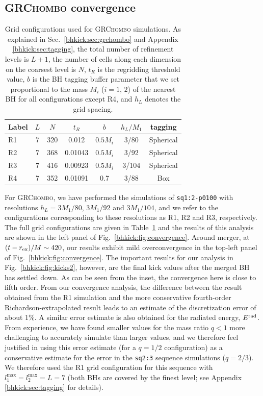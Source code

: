 \subsection{\textsc{GRChombo} convergence}
\begin{table}[b]
{   
    \caption{Grid configurations used for \textsc{GRChombo} simulations.
    As explained in Sec.~\ref{bhkick:sec:grchombo} and Appendix \ref{bhkick:sec:tagging},
    the total 
    number of refinement levels is $L+1$, the number of cells along each
    dimension on the coarsest level is $N$, $t_R$ is the regridding 
    threshold value, $b$ is the BH tagging buffer parameter
    that we
    set proportional to the mass $M_i$ ($i=1,\,2$)
    of the nearest BH for all configurations except R4, 
    and $h_L$ denotes the grid spacing.
    }
    \centering
    \begin{tabular}{lcccccc}\hline
        Label & $L$ & $N$ & $t_R$ & $b$ & $h_L/M_1$ & tagging\\
        \hline
        R1 & 7 & 320 & 0.012 & $0.5M_i$ & 3/80 & Spherical \\
        R2 & 7 & 368 & 0.01043 & $0.5M_i$ & 3/92 & Spherical\\
        R3 & 7 & 416 & 0.00923 & $0.5M_i$ & 3/104 & Spherical\\
        R4 & 7 & 352 & 0.01091 & 0.7 & 3/88 & Box\\\hline
    \end{tabular}
}
    \label{bhkick:tab:grchombo-grids}
\end{table}
For \textsc{GRChombo}, we have performed the simulations of 
\texttt{sq1:2-p0100} with resolutions $h_L=3M_1/80$, $3M_1/92$ and 
$3M_1/104$, and we refer to the configurations corresponding to these 
resolutions as R1, R2 and R3, respectively.
The full grid configurations 
are given in Table~\ref{bhkick:tab:grchombo-grids} and the results of this 
analysis are shown in the left panel of Fig.~\ref{bhkick:fig:convergence}. Around
merger, at $(t-r_{\rm ex})/M\sim 420$, our results exhibit mild
overconvergence
in the top-left panel of Fig.~\ref{bhkick:fig:convergence}.
The important results for our analysis in Fig.~\ref{bhkick:fig:kicks2},
however, are the final kick values after the merged BH has settled down.
As can be seen from the inset, the convergence here is close to 
fifth order. 
From our convergence 
analysis, the difference between the result obtained from the R1 simulation 
and the more conservative fourth-order Richardson-extrapolated result leads 
to an estimate of the discretization error of about $1\%$. A similar error 
estimate is also obtained for the radiated energy, $E^{\mathrm{rad}}$.
From experience, we have found smaller values for the mass ratio $q<1$ 
more challenging to accurately simulate than larger values, and we 
therefore feel justified in using this error estimate (for a $q=1/2$ 
configuration) as a conservative estimate for the error in the 
\texttt{sq2:3} sequence simulations ($q=2/3$). We therefore used the R1 grid
configuration for this sequence with  $l_1^{\max}=l_2^{\max}=L=7$ 
(both BHs are covered by 
the finest level; see Appendix \ref{bhkick:sec:tagging} for details).

